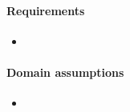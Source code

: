 \begin{itemize}
    \paragraph{Requirements}
   \begin{itemize}
       \item 
   \end{itemize}
   \paragraph{Domain assumptions}
   \begin{itemize}
       \item 
   \end{itemize}
\end{itemize}